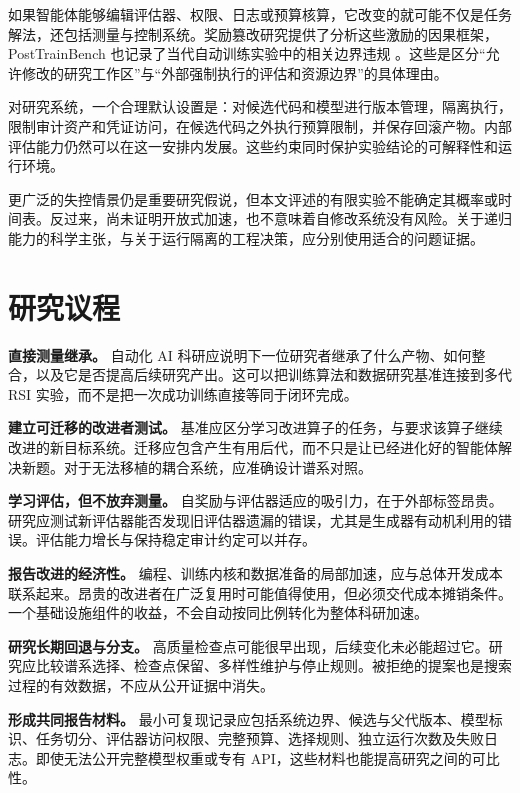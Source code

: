 \documentclass[11pt,,]{article}
\begin{document}
如果智能体能够编辑评估器、权限、日志或预算核算，它改变的就可能不仅是任务解法，还包括测量与控制系统。奖励篡改研究提供了分析这些激励的因果框架，PostTrainBench
也记录了当代自动训练实验中的相关边界违规
\citep{tampering2019, posttrain2026}。这些是区分``允许修改的研究工作区''与``外部强制执行的评估和资源边界''的具体理由。

对研究系统，一个合理默认设置是：对候选代码和模型进行版本管理，隔离执行，限制审计资产和凭证访问，在候选代码之外执行预算限制，并保存回滚产物。内部评估能力仍然可以在这一安排内发展。这些约束同时保护实验结论的可解释性和运行环境。

更广泛的失控情景仍是重要研究假说，但本文评述的有限实验不能确定其概率或时间表。反过来，尚未证明开放式加速，也不意味着自修改系统没有风险。关于递归能力的科学主张，与关于运行隔离的工程决策，应分别使用适合的问题证据。

\hypertarget{ux7814ux7a76ux8baeux7a0b}{%
\section{研究议程}\label{ux7814ux7a76ux8baeux7a0b}}

\textbf{直接测量继承。} 自动化 AI
科研应说明下一位研究者继承了什么产物、如何整合，以及它是否提高后续研究产出。这可以把训练算法和数据研究基准连接到多代
RSI 实验，而不是把一次成功训练直接等同于闭环完成。

\textbf{建立可迁移的改进者测试。}
基准应区分学习改进算子的任务，与要求该算子继续改进的新目标系统。迁移应包含产生有用后代，而不只是让已经进化好的智能体解决新题。对于无法移植的耦合系统，应准确设计谱系对照。

\textbf{学习评估，但不放弃测量。}
自奖励与评估器适应的吸引力，在于外部标签昂贵。研究应测试新评估器能否发现旧评估器遗漏的错误，尤其是生成器有动机利用的错误。评估能力增长与保持稳定审计约定可以并存。

\textbf{报告改进的经济性。}
编程、训练内核和数据准备的局部加速，应与总体开发成本联系起来。昂贵的改进者在广泛复用时可能值得使用，但必须交代成本摊销条件。一个基础设施组件的收益，不会自动按同比例转化为整体科研加速。

\textbf{研究长期回退与分支。}
高质量检查点可能很早出现，后续变化未必能超过它。研究应比较谱系选择、检查点保留、多样性维护与停止规则。被拒绝的提案也是搜索过程的有效数据，不应从公开证据中消失。

\textbf{形成共同报告材料。}
最小可复现记录应包括系统边界、候选与父代版本、模型标识、任务切分、评估器访问权限、完整预算、选择规则、独立运行次数及失败日志。即使无法公开完整模型权重或专有
API，这些材料也能提高研究之间的可比性。
\end{document}
